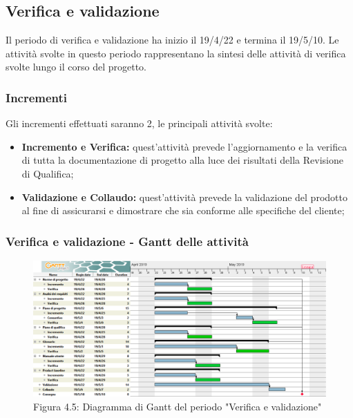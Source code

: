 \subsection{Verifica e validazione}
Il periodo di verifica e validazione ha inizio il 19/4/22 e termina il 19/5/10.
Le attività svolte in questo periodo rappresentano la sintesi delle attività di verifica svolte lungo il corso del progetto.

\subsubsection{Incrementi}
Gli incrementi effettuati saranno 2, le principali attività svolte:
\begin{itemize}

	\item \textbf{Incremento e Verifica:} quest'attività prevede l'aggiornamento e la verifica di tutta la documentazione di progetto alla luce dei risultati della Revisione di Qualifica;

	\item \textbf{Validazione e Collaudo:} quest'attività prevede la validazione del prodotto al fine di assicurarsi e dimostrare che sia conforme alle specifiche del cliente;

\end{itemize}
 
 \subsubsection{Verifica e validazione - Gantt delle attività}

\begin{figure} [H]
	\centering
	\includegraphics[scale=0.35]{Res/Gantt/Validazione}
	\caption{Figura 4.5: Diagramma di Gantt del periodo "Verifica e validazione"}\label{}
\end{figure}

 
\pagebreak
